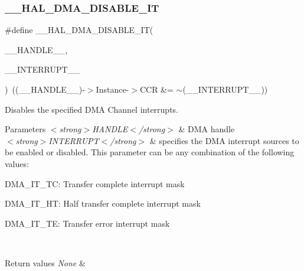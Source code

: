 \subsubsection{\texorpdfstring{\+\_\+\+\_\+\+H\+A\+L\+\_\+\+D\+M\+A\+\_\+\+D\+I\+S\+A\+B\+L\+E\+\_\+\+IT}{\_\_HAL\_DMA\_DISABLE\_IT}}
{\footnotesize\ttfamily \#define \+\_\+\+\_\+\+H\+A\+L\+\_\+\+D\+M\+A\+\_\+\+D\+I\+S\+A\+B\+L\+E\+\_\+\+IT(\begin{DoxyParamCaption}\item[{}]{\+\_\+\+\_\+\+H\+A\+N\+D\+L\+E\+\_\+\+\_\+,  }\item[{}]{\+\_\+\+\_\+\+I\+N\+T\+E\+R\+R\+U\+P\+T\+\_\+\+\_\+ }\end{DoxyParamCaption})~((\+\_\+\+\_\+\+H\+A\+N\+D\+L\+E\+\_\+\+\_\+)-\/$>$Instance-\/$>$C\+CR \&= $\sim$(\+\_\+\+\_\+\+I\+N\+T\+E\+R\+R\+U\+P\+T\+\_\+\+\_\+))}



Disables the specified D\+MA Channel interrupts. 


\begin{DoxyParams}{Parameters}
{\em $<$strong$>$\+H\+A\+N\+D\+L\+E$<$/strong$>$} & D\+MA handle \\
\hline
{\em $<$strong$>$\+I\+N\+T\+E\+R\+R\+U\+P\+T$<$/strong$>$} & specifies the D\+MA interrupt sources to be enabled or disabled. This parameter can be any combination of the following values\+: \begin{DoxyItemize}
\item D\+M\+A\+\_\+\+I\+T\+\_\+\+TC\+: Transfer complete interrupt mask \item D\+M\+A\+\_\+\+I\+T\+\_\+\+HT\+: Half transfer complete interrupt mask \item D\+M\+A\+\_\+\+I\+T\+\_\+\+TE\+: Transfer error interrupt mask \end{DoxyItemize}
\\
\hline
\end{DoxyParams}

\begin{DoxyRetVals}{Return values}
{\em None} & \\
\hline
\end{DoxyRetVals}
\mbox{\label{group___d_m_a___exported___macros_ga93900b3ef3f87ef924eb887279a434b4}} 

